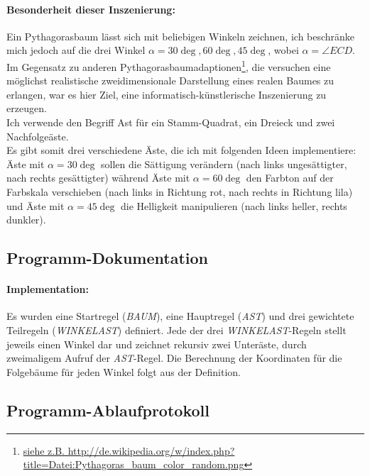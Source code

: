 \paragraph{Besonderheit dieser Inszenierung:}
Ein Pythagorasbaum lässt sich mit beliebigen Winkeln zeichnen, ich beschränke mich jedoch auf die drei Winkel $\alpha=30\deg,60\deg,45\deg$,
wobei $\alpha=\angle ECD$.
Im Gegensatz zu anderen Pythagorasbaumadaptionen\footnote{
\href{http://de.wikipedia.org/w/index.php?title=Datei:Pythagoras\_baum\_color\_random.png}
     {siehe z.B. http://de.wikipedia.org/w/index.php?title=Datei:Pythagoras\_baum\_color\_random.png}},
die versuchen eine möglichst realistische zweidimensionale Darstellung eines realen Baumes zu erlangen, war es hier Ziel,
eine informatisch-künstlerische Inszenierung zu erzeugen. \\
Ich verwende den Begriff Ast für ein Stamm-Quadrat, ein Dreieck und zwei Nachfolgeäste.\\
Es gibt somit drei verschiedene Äste, die ich mit folgenden Ideen implementiere:
Äste mit $\alpha=30\deg$ sollen die Sättigung verändern (nach links ungesättigter, nach rechts gesättigter) während
Äste mit $\alpha=60\deg$ den Farbton auf der Farbskala verschieben (nach links in Richtung rot, nach rechts in Richtung lila) und
Äste mit $\alpha=45\deg$ die Helligkeit manipulieren (nach links heller, rechts dunkler).
\subsection{Programm-Dokumentation}
\paragraph{Implementation:}
Es wurden eine Startregel (\emph{BAUM}), eine Hauptregel (\emph{AST}) und drei gewicht\-et\-e Teilregeln (\emph{WINKELAST}) definiert.
Jede der drei \emph{WINKELAST}-Regeln stellt jeweils einen Winkel dar und zeichnet rekursiv zwei Unteräste,
durch zweimaligem Aufruf der \emph{AST}-Regel.
Die Berechnung der Koordinaten für die Folgebäume für jeden Winkel folgt aus der Definition.
\newpage
\subsection{Programm-Ablaufprotokoll}
